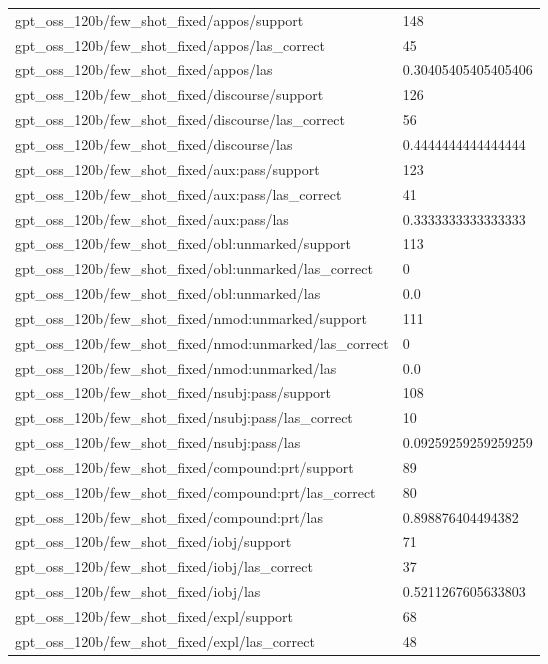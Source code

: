 \begin{tabular}{ll}
gpt\_oss\_120b/few\_shot\_fixed/appos/support & 148 \\
gpt\_oss\_120b/few\_shot\_fixed/appos/las\_correct & 45 \\
gpt\_oss\_120b/few\_shot\_fixed/appos/las & 0.30405405405405406 \\
gpt\_oss\_120b/few\_shot\_fixed/discourse/support & 126 \\
gpt\_oss\_120b/few\_shot\_fixed/discourse/las\_correct & 56 \\
gpt\_oss\_120b/few\_shot\_fixed/discourse/las & 0.4444444444444444 \\
gpt\_oss\_120b/few\_shot\_fixed/aux:pass/support & 123 \\
gpt\_oss\_120b/few\_shot\_fixed/aux:pass/las\_correct & 41 \\
gpt\_oss\_120b/few\_shot\_fixed/aux:pass/las & 0.3333333333333333 \\
gpt\_oss\_120b/few\_shot\_fixed/obl:unmarked/support & 113 \\
gpt\_oss\_120b/few\_shot\_fixed/obl:unmarked/las\_correct & 0 \\
gpt\_oss\_120b/few\_shot\_fixed/obl:unmarked/las & 0.0 \\
gpt\_oss\_120b/few\_shot\_fixed/nmod:unmarked/support & 111 \\
gpt\_oss\_120b/few\_shot\_fixed/nmod:unmarked/las\_correct & 0 \\
gpt\_oss\_120b/few\_shot\_fixed/nmod:unmarked/las & 0.0 \\
gpt\_oss\_120b/few\_shot\_fixed/nsubj:pass/support & 108 \\
gpt\_oss\_120b/few\_shot\_fixed/nsubj:pass/las\_correct & 10 \\
gpt\_oss\_120b/few\_shot\_fixed/nsubj:pass/las & 0.09259259259259259 \\
gpt\_oss\_120b/few\_shot\_fixed/compound:prt/support & 89 \\
gpt\_oss\_120b/few\_shot\_fixed/compound:prt/las\_correct & 80 \\
gpt\_oss\_120b/few\_shot\_fixed/compound:prt/las & 0.898876404494382 \\
gpt\_oss\_120b/few\_shot\_fixed/iobj/support & 71 \\
gpt\_oss\_120b/few\_shot\_fixed/iobj/las\_correct & 37 \\
gpt\_oss\_120b/few\_shot\_fixed/iobj/las & 0.5211267605633803 \\
gpt\_oss\_120b/few\_shot\_fixed/expl/support & 68 \\
gpt\_oss\_120b/few\_shot\_fixed/expl/las\_correct & 48 \\

\end{tabular}

